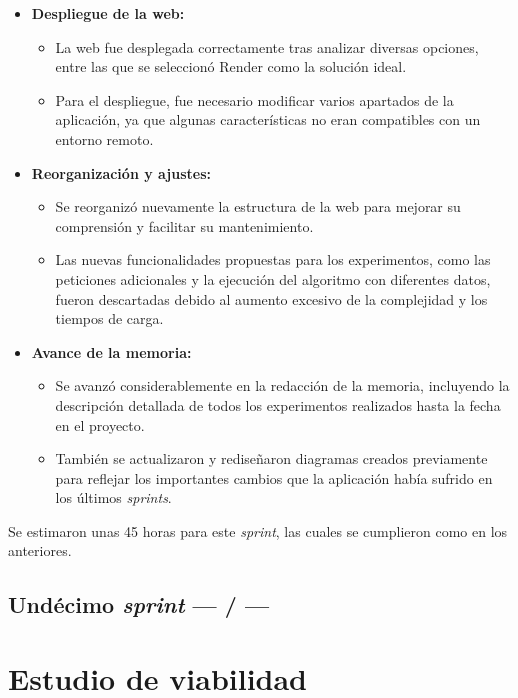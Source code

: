 \begin{itemize}
    \item \textbf{Despliegue de la web:}
    \begin{itemize}
        \item La web fue desplegada correctamente tras analizar diversas opciones, entre las que se seleccionó Render como la solución ideal.
        \item Para el despliegue, fue necesario modificar varios apartados de la aplicación, ya que algunas características no eran compatibles con un entorno remoto.
    \end{itemize}

    \item \textbf{Reorganización y ajustes:}
    \begin{itemize}
        \item Se reorganizó nuevamente la estructura de la web para mejorar su comprensión y facilitar su mantenimiento.
        \item Las nuevas funcionalidades propuestas para los experimentos, como las peticiones adicionales y la ejecución del algoritmo con diferentes datos, fueron descartadas debido al aumento excesivo de la complejidad y los tiempos de carga.
    \end{itemize}

    \item \textbf{Avance de la memoria:}
    \begin{itemize}
        \item Se avanzó considerablemente en la redacción de la memoria, incluyendo la descripción detallada de todos los experimentos realizados hasta la fecha en el proyecto.
        \item También se actualizaron y rediseñaron diagramas creados previamente para reflejar los importantes cambios que la aplicación había sufrido en los últimos \textit{sprints}.
    \end{itemize}
\end{itemize}

Se estimaron unas 45 horas para este \textit{sprint}, las cuales se cumplieron como en los anteriores.

\subsection{Undécimo \textit{sprint} --- / ---}



\section{Estudio de viabilidad}

